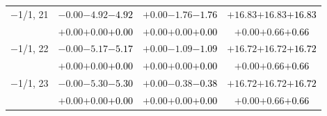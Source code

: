 \documentclass[compress]{beamer}
\begin{document}
\begin{frame}
\begin{tabular}{r | c | c | c}
$-$1/1, 21 & $-0.00$\hspace{0.1 cm}$-4.92$\hspace{0.1 cm}\textcolor{black}{$-4.92$} & $+0.00$\hspace{0.1 cm}$-1.76$\hspace{0.1 cm}\textcolor{black}{$-1.76$} & $+16.83$\hspace{0.1 cm}$+16.83$\hspace{0.1 cm}\textcolor{black}{$+16.83$} \\
           & $+0.00$\hspace{0.1 cm}$+0.00$\hspace{0.1 cm}\textcolor{black}{$+0.00$} & $+0.00$\hspace{0.1 cm}$+0.00$\hspace{0.1 cm}\textcolor{black}{$+0.00$} & $+0.00$\hspace{0.1 cm}$+0.66$\hspace{0.1 cm}\textcolor{black}{$+0.66$} \\
$-$1/1, 22 & $-0.00$\hspace{0.1 cm}$-5.17$\hspace{0.1 cm}\textcolor{black}{$-5.17$} & $+0.00$\hspace{0.1 cm}$-1.09$\hspace{0.1 cm}\textcolor{black}{$-1.09$} & $+16.72$\hspace{0.1 cm}$+16.72$\hspace{0.1 cm}\textcolor{black}{$+16.72$} \\
           & $+0.00$\hspace{0.1 cm}$+0.00$\hspace{0.1 cm}\textcolor{black}{$+0.00$} & $+0.00$\hspace{0.1 cm}$+0.00$\hspace{0.1 cm}\textcolor{black}{$+0.00$} & $+0.00$\hspace{0.1 cm}$+0.66$\hspace{0.1 cm}\textcolor{black}{$+0.66$} \\
$-$1/1, 23 & $-0.00$\hspace{0.1 cm}$-5.30$\hspace{0.1 cm}\textcolor{black}{$-5.30$} & $+0.00$\hspace{0.1 cm}$-0.38$\hspace{0.1 cm}\textcolor{black}{$-0.38$} & $+16.72$\hspace{0.1 cm}$+16.72$\hspace{0.1 cm}\textcolor{black}{$+16.72$} \\
           & $+0.00$\hspace{0.1 cm}$+0.00$\hspace{0.1 cm}\textcolor{black}{$+0.00$} & $+0.00$\hspace{0.1 cm}$+0.00$\hspace{0.1 cm}\textcolor{black}{$+0.00$} & $+0.00$\hspace{0.1 cm}$+0.66$\hspace{0.1 cm}\textcolor{black}{$+0.66$} \\

\end{tabular}
\end{frame}
\end{document}
